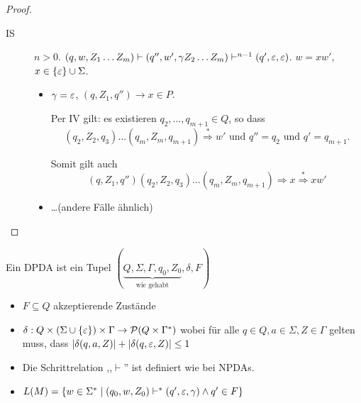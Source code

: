 \begin{proof}
\begin{itemize}
\begin{itemize}
\begin{description}
    \item[IS] $n > 0$.
      $(q, w, Z_1\ldots Z_m) \vdash (q'', w', \gamma Z_2\ldots Z_m) \vdash^{n-1} (q',\varepsilon, \varepsilon)$.
      $w =xw'$, \enspace $x \in \{\varepsilon\} \cup \Sigma$.
      \begin{itemize}
      \item $\gamma = \varepsilon$, \enspace $(q, Z_1, q'') \to x \in P$.

        Per IV gilt: es existieren $q_2,\ldots,q_{m+1} \in Q$, so dass
        \begin{displaymath}
          (q_2, Z_2, q_3)\ldots(q_m,Z_m,q_{m+1}) \stackrel{*}{\Longrightarrow} w' \text{ und } q''=q_2 \text{ und } q'=q_{m+1}.
        \end{displaymath}

        Somit gilt auch
        \begin{displaymath}
          (q, Z_1, q'') (q_2, Z_2, q_3)\ldots(q_m,Z_m,q_{m+1})\Longrightarrow x\stackrel{*}{\Longrightarrow} xw'
        \end{displaymath}
      \item \ldots (andere Fälle ähnlich)
      \end{itemize}
      \end{description}
  \end{itemize}
\end{itemize}
  
\end{proof}

\begin{Def}[name={[DPDA]}]
        Ein \ac{DPDA} ist ein Tupel $(\underbrace{Q,\Sigma,\Gamma,q_0,Z_0}_{\text{wie gehabt}},\delta,F)$
        \vspace{-1em}
        \begin{itemize}
        \item $F\subseteq Q$ akzeptierende Zustände
        \item $\delta: Q\x (\Sigma\cup\{\Eps\})\x \Gamma \-> \mathcal{P}(Q\x \Gamma^*)$ wobei für alle $q\in Q,a\in\Sigma,Z\in\Gamma$ gelten muss, dass
        $|\delta(q,a,Z)| + |\delta(q,\varepsilon,Z)| \leq 1$
        \item Die Schrittrelation ,,$\vdash$'' ist definiert wie bei NPDAs.
        \item $L(M) = \{w\in\Sigma^* \mid (q_0,w,Z_0) \vdash^* (q',\varepsilon,\gamma) \land q'\in F \}$ \qedhere
        \end{itemize}
\end{Def}

